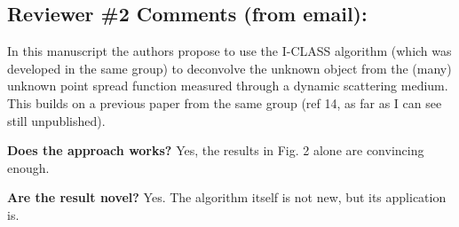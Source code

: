 \documentclass[12pt]{article}
\begin{document}
\subsection*{Reviewer \#2 Comments (from email):}

In this manuscript the authors propose to use the I-CLASS algorithm (which was developed in the same group) to deconvolve the unknown object from the (many) unknown point spread function measured through a dynamic scattering medium. This builds on a previous paper from the same group (ref 14, as far as I can see still unpublished).

\textbf{Does the approach works?} Yes, the results in Fig. 2 alone are convincing enough.

\textbf{Are the result novel?} Yes. The algorithm itself is not new, but its application is.
\end{document}
